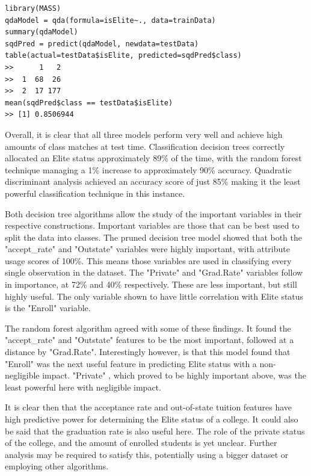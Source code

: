 \documentclass[paper=a4, fontsize=11pt]{scrartcl} %
\begin{document}
{{\begin{lstlisting}
library(MASS)
qdaModel = qda(formula=isElite~., data=trainData)
summary(qdaModel)
sqdPred = predict(qdaModel, newdata=testData)
table(actual=testData$isElite, predicted=sqdPred$class)
>>      1   2
>>  1  68  26
>>  2  17 177
mean(sqdPred$class == testData$isElite) 
>> [1] 0.8506944
\end{lstlisting}
{\par Overall, it is clear that all three models perform very well and achieve high amounts of class matches at test time. Classification decision trees correctly allocated an Elite status approximately 89\% of the time, with the random forest technique managing a 1\% increase to approximately 90\% accuracy. Quadratic discriminant analysis achieved an accuracy score of just 85\% making it the least powerful classification technique in this instance.}
{\par Both decision tree algorithms allow the study of the important variables in their respective constructions. Important variables are those that can be best used to split the data into classes. The pruned decision tree model showed that both the "accept\_rate" and "Outstate" variables were highly important, with attribute usage scores of 100\%. This means those variables are used in classifying every single observation in the dataset. The "Private" and "Grad.Rate" variables follow in importance, at 72\% and 40\% respectively. These are less important, but still highly useful. The only variable shown to have little correlation with Elite status is the "Enroll" variable.}
{\par The random forest algorithm agreed with some of these findings. It found the "accept\_rate" and "Outstate" features to be the most important, followed at a distance by "Grad.Rate". Interestingly however, is that this model found that "Enroll" was the next useful feature in predicting Elite status with a non-negligible impact. "Private" , which proved to be highly important above, was the least powerful here with negligible impact.}
{\par It is clear then that the acceptance rate and out-of-state tuition features have high predictive power for determining the Elite status of a college. It could also be said that the graduation rate is also useful here. The role of the private status of the college, and the amount of enrolled students is yet unclear. Further analysis may be required to satisfy this, potentially using a bigger dataset or employing other algorithms.}}}\\\\
\end{document}
